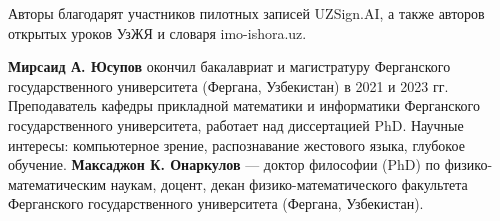 \documentclass[a4paper,fleqn]{cas-dc}
\begin{document}
Авторы благодарят участников пилотных записей UZSign.AI, а также авторов открытых уроков УзЖЯ и словаря imo-ishora.uz.



\bio{}
\textbf{Мирсаид А. Юсупов} окончил бакалавриат и магистратуру Ферганского государственного университета (Фергана, Узбекистан) в 2021 и 2023 гг. Преподаватель кафедры прикладной математики и информатики Ферганского государственного университета, работает над диссертацией PhD. Научные интересы: компьютерное зрение, распознавание жестового языка, глубокое обучение.
\endbio
\bio{}
\textbf{Максаджон К. Онаркулов} — доктор философии (PhD) по физико-математическим наукам, доцент, декан физико-математического факультета Ферганского государственного университета (Фергана, Узбекистан).
\endbio
\end{document}

